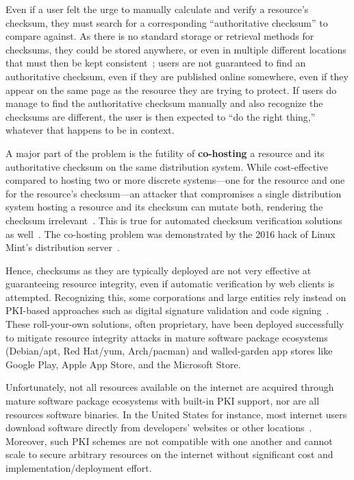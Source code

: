 Even if a user felt the urge to manually calculate and verify a resource's
checksum, they must search for a corresponding ``authoritative checksum'' to
compare against. As there is no standard storage or retrieval methods for
checksums, they could be stored anywhere, or even in multiple different
locations that must then be kept consistent~\cite{Cherubini}; users are not
guaranteed to find an authoritative checksum, even if they are published online
somewhere, even if they appear on the same page as the resource they are trying
to protect. If users do manage to find the authoritative checksum manually and
also recognize the checksums are different, the user is then expected to ``do
the right thing,'' whatever that happens to be in context.

A major part of the problem is the futility of \textbf{co-hosting} a resource
and its authoritative checksum on the same distribution system. While
cost-effective compared to hosting two or more discrete systems---one for the
resource and one for the resource's checksum---an attacker that compromises a
single distribution system hosting a resource and its checksum can mutate both,
rendering the checksum irrelevant~\cite{Stickler}. This is true for automated
checksum verification solutions as well~\cite{Cherubini}. The co-hosting problem
was demonstrated by the 2016 hack of Linux Mint's distribution
server~\cite{SCA-MINT1, SCA-MINT2}.

Hence, checksums as they are typically deployed are not very effective at
guaranteeing resource integrity, even if automatic verification by web clients
is attempted. Recognizing this, some corporations and large entities rely
instead on PKI-based approaches such as digital signature validation and code
signing~\cite{PKI}. These roll-your-own solutions, often proprietary, have been
deployed successfully to mitigate resource integrity attacks in mature software
package ecosystems (\eg Debian/apt, Red Hat/yum, Arch/pacman) and walled-garden
app stores like Google Play, Apple App Store, and the Microsoft Store.

Unfortunately, not all resources available on the internet are acquired through
mature software package ecosystems with built-in PKI support, nor are all
resources software binaries. In the United States for instance, most internet
users download software directly from developers' websites or other
locations~\cite{Cherubini, File}. Moreover, such PKI schemes are not compatible
with one another and cannot scale to secure arbitrary resources on the internet
without significant cost and implementation/deployment effort.

